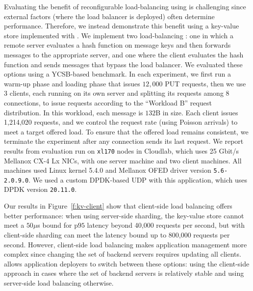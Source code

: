 Evaluating the benefit of reconfigurable load-balancing using \etlapp is challenging since external factors (\eg where the load balancer is deployed) often determine performance. Therefore, we instead demonstrate this benefit using a key-value store implemented with \name. We implement two load-balancing \tunnels: one in which a remote server evaluates a hash function on message keys and then forwards messages to the appropriate server, and one where the client evaluates the hash function and sends messages that bypass the load balancer. We evaluated these options using a YCSB-based benchmark. In each experiment, we first run a warm-up phase and loading phase that issues $12,000$ PUT requests, then we use 3 clients, each running on its own server and splitting its requests among $8$ connections, to issue requests according to the ``Workload B'' request distribution.  In this workload, each message is $132$B in size. Each client issues 1,214,020 requests, and we control the request rate (using Poisson arrivals) to meet a target offered load. To ensure that the offered load remains consistent, we terminate the experiment after any connection sends its last request. We report results from evaluation run on  \texttt{xl170} nodes in Cloudlab, which uses 25 Gbit/s Mellanox CX-4 Lx NICs, with one server machine and two client machines. All machines used Linux kernel 5.4.0 and Mellanox OFED driver version \texttt{5.6-2.0.9.0}. We used a custom DPDK-based UDP \tunnel with this application, which uses DPDK version \texttt{20.11.0}. 





Our results in Figure~\ref{f:kv-client} show that client-side load balancing offers better performance: when using server-side sharding, the key-value store cannot meet a $50\mu$s bound for p$95$ latency beyond 40,000 requests per second, but with client-side sharding can meet the latency bound up to 800,000 requests per second. However, client-side load balancing makes application management more complex since changing the set of backend servers requires updating all clients. \name allows application deployers to switch between these options: using the client-side approach in cases where the set of backend servers is relatively stable and using server-side load balancing otherwise.








